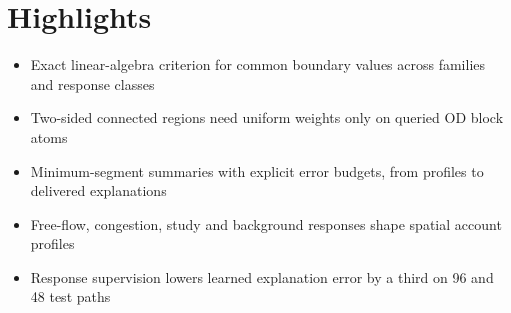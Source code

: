 \documentclass{article}
\begin{document}
\section*{Highlights}
\begin{itemize}
\item Exact linear-algebra criterion for common boundary values across families and response classes
\item Two-sided connected regions need uniform weights only on queried OD block atoms
\item Minimum-segment summaries with explicit error budgets, from profiles to delivered explanations
\item Free-flow, congestion, study and background responses shape spatial account profiles
\item Response supervision lowers learned explanation error by a third on 96 and 48 test paths
\end{itemize}
\end{document}
